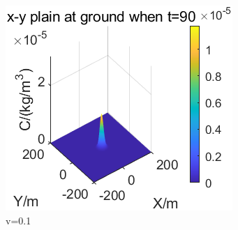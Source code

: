 \documentclass{article}
\begin{document}
\begin{figure}[htbp]
\begin{minipage}{0.33\textwidth}
		\end{minipage}
		\begin{minipage}{0.33\textwidth}
			\includegraphics[width=\textwidth]{pics/v=0.1,t=90.png}
		\end{minipage}
		\caption{v=0.1}
		\label{fig14}
	\end{figure}
\end{document}
